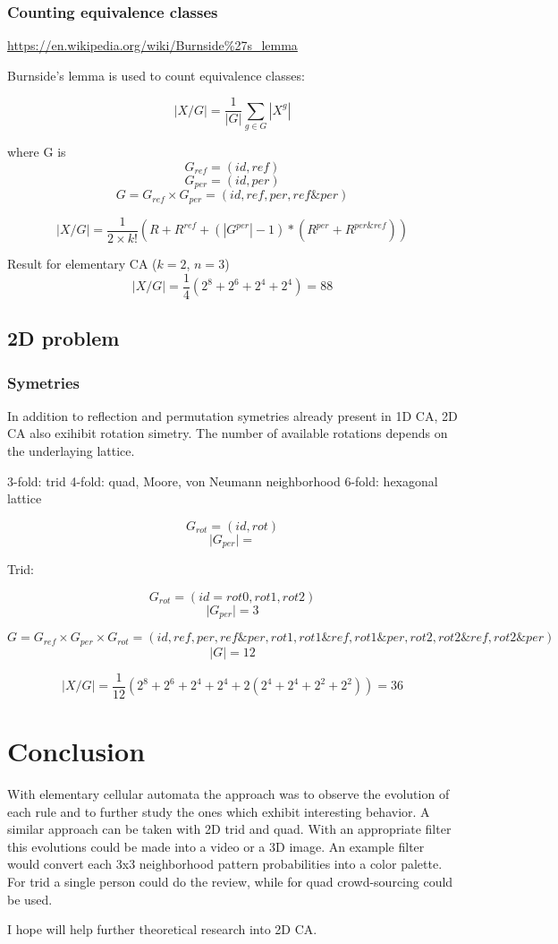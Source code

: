 \documentclass{ijuc}
\begin{document}
\subsubsection{Counting equivalence classes}

\url{https://en.wikipedia.org/wiki/Burnside%27s_lemma}

Burnside's lemma is used to count equivalence classes:

\[ |X/G| = \frac{1}{|G|}\sum_{g \in G}|X^g| \]

where G is 
\[ G_{ref} = (id, ref) \]
\[ G_{per} = (id, per) \]
\[ G = G_{ref} \times G_{per} = (id, ref, per, ref \& per) \]

\[ |X/G| = \frac{1}{2 \times k!} ( R + R^{ref} + (|G^{per}|-1)*(R^{per} + R^{per \& ref}) ) \]

Result for elementary CA (\(k=2\), \(n=3\))
\[ |X/G| = \frac{1}{4} (2^8 + 2^6 + 2^4 + 2^4) = 88 \]

\subsection{2D problem}

\subsubsection{Symetries}

In addition to reflection and permutation symetries already present in 1D CA,
2D CA also exihibit rotation simetry. The number of available rotations depends
on the underlaying lattice.

3-fold: trid
4-fold: quad, Moore, von Neumann neighborhood
6-fold: hexagonal lattice

\[ G_{rot} = (id, rot) \]
\[ \vert G_{per} \vert =  \]

Trid:

\[ G_{rot} = (id=rot0, rot1, rot2) \]
\[ \vert G_{per} \vert = 3 \]

\[ G = G_{ref} \times G_{per} \times G_{rot} = (id, ref, per, ref \& per, rot1, rot1 \& ref, rot1 \& per, rot2, rot2 \& ref, rot2 \& per) \]
\[ \vert G \vert = 12 \]

\[ |X/G| = \frac{1}{12} (2^8 + 2^6 + 2^4 + 2^4 + 2 (2^4 + 2^4 + 2^2 + 2^2)) = 36 \]

\section{Conclusion}

With elementary cellular automata the approach was to observe the evolution of
each rule and to further study the ones which exhibit interesting behavior.
A similar approach can be taken with 2D trid and quad. With an appropriate filter
this evolutions could be made into a video or a 3D image. An example filter would
convert each 3x3 neighborhood pattern probabilities into a color palette. For trid
a single person could do the review, while for quad crowd-sourcing could be used.

I hope will help further theoretical research into 2D CA.



\appendix 
\end{document}
